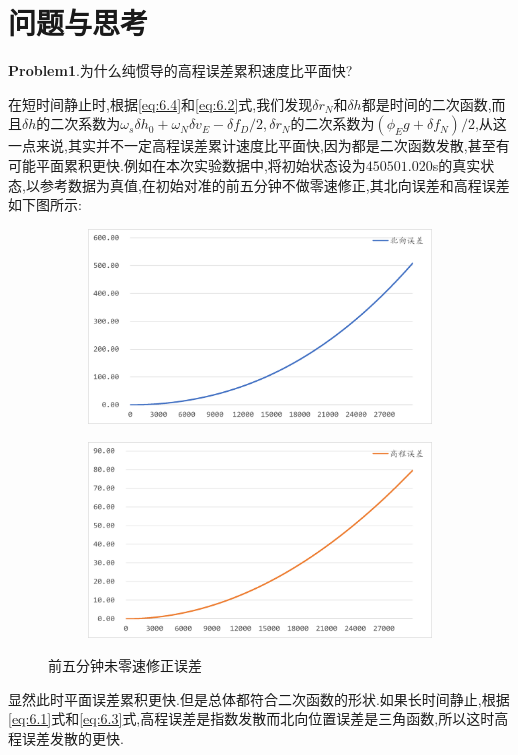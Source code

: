 \documentclass[10pt,a4paper]{ctexart}
\begin{document}
\section{问题与思考}

\noindent\textbf{Problem1}.为什么纯惯导的高程误差累积速度比平面快?

在短时间静止时,根据\eqref{eq:6.4}和\eqref{eq:6.2}式,我们发现$\delta r_N$和$\delta h$都是时间的二次函数,而且$\delta h$的二次系数为$\omega_s\delta h_0+\omega_N \delta v_E-\delta f_D/2$,\,$\delta r_N$的二次系数为$(\phi_E g+\delta f_N)/2$,从这一点来说,其实并不一定高程误差累计速度比平面快,因为都是二次函数发散,甚至有可能平面累积更快.例如在本次实验数据中,将初始状态设为$450501.020$s的真实状态,以参考数据为真值,在初始对准的前五分钟不做零速修正,其北向误差和高程误差如下图所示:
\begin{figure}[H]
    \centering
    {
        \begin{subfigure}{0.49\textwidth}
            \centering
            \includegraphics[width=\linewidth]{Figures/DataFigure/未零速修正北向误差.png}
        \end{subfigure}\hfill
        \begin{subfigure}{0.49\textwidth}
            \centering
            \includegraphics[width=\linewidth]{Figures/DataFigure/未零速修正高程误差.png}
        \end{subfigure}
    }
    \caption{前五分钟未零速修正误差}
    \label{fig:7.1}
\end{figure}
\noindent 显然此时平面误差累积更快.但是总体都符合二次函数的形状.如果长时间静止,根据\eqref{eq:6.1}式和\eqref{eq:6.3}式,高程误差是指数发散而北向位置误差是三角函数,所以这时高程误差发散的更快.
\end{document}
